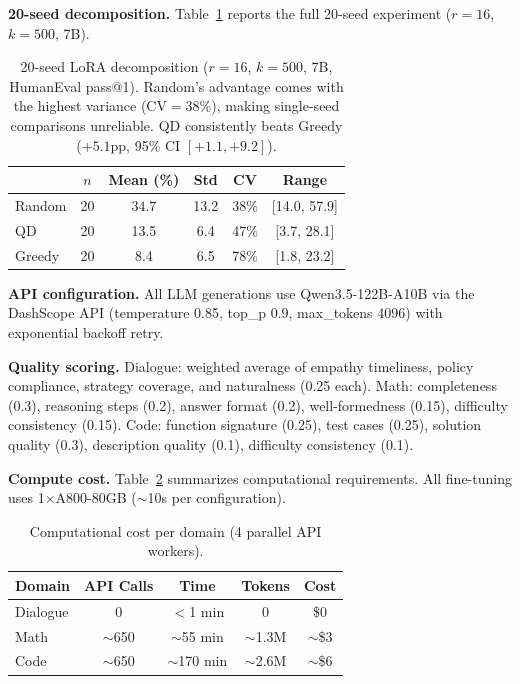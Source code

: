 \documentclass{article}
\theoremstyle{plain}
\theoremstyle{remark}
\begin{document}
\textbf{20-seed decomposition.}
Table~\ref{tab:20seed} reports the full 20-seed experiment ($r{=}16$, $k{=}500$, 7B).

\begin{table}[h]
\centering
\caption{20-seed LoRA decomposition ($r{=}16$, $k{=}500$, 7B, HumanEval pass@1). Random's advantage comes with the highest variance (CV$=$38\%), making single-seed comparisons unreliable. QD consistently beats Greedy ($+5.1$pp, 95\% CI $[+1.1, +9.2]$).}
\label{tab:20seed}
\begin{tabular}{lccccc}
\toprule
 & $n$ & \textbf{Mean (\%)} & \textbf{Std} & \textbf{CV} & \textbf{Range} \\
\midrule
Random & 20 & $\mathbf{34.7}$ & 13.2 & 38\% & [14.0, 57.9] \\
QD & 20 & 13.5 & 6.4 & 47\% & [3.7, 28.1] \\
Greedy & 20 & 8.4 & 6.5 & 78\% & [1.8, 23.2] \\
\bottomrule
\end{tabular}
\end{table}

\textbf{API configuration.}
All LLM generations use Qwen3.5-122B-A10B via the DashScope API (temperature 0.85, top\_p 0.9, max\_tokens 4096) with exponential backoff retry.

\textbf{Quality scoring.}
Dialogue: weighted average of empathy timeliness, policy compliance, strategy coverage, and naturalness (0.25 each).
Math: completeness (0.3), reasoning steps (0.2), answer format (0.2), well-formedness (0.15), difficulty consistency (0.15).
Code: function signature (0.25), test cases (0.25), solution quality (0.3), description quality (0.1), difficulty consistency (0.1).

\textbf{Compute cost.}
Table~\ref{tab:compute} summarizes computational requirements. All fine-tuning uses 1$\times$A800-80GB ($\sim$10s per configuration).

\begin{table}[h]
\centering
\caption{Computational cost per domain (4 parallel API workers).}
\label{tab:compute}
\begin{tabular}{lcccc}
\toprule
\textbf{Domain} & \textbf{API Calls} & \textbf{Time} & \textbf{Tokens} & \textbf{Cost} \\
\midrule
Dialogue & 0 & $<$1 min & 0 & \$0 \\
Math & $\sim$650 & $\sim$55 min & $\sim$1.3M & $\sim$\$3 \\
Code & $\sim$650 & $\sim$170 min & $\sim$2.6M & $\sim$\$6 \\
\bottomrule
\end{tabular}
\end{table}
\end{document}

